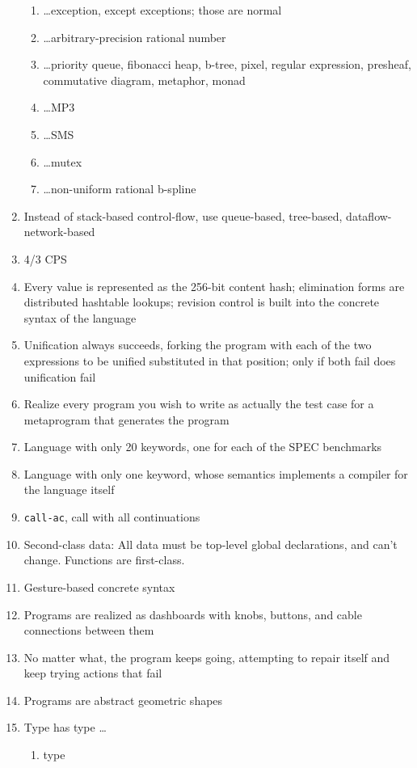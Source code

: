 \documentclass[acmtocl]%
{boviktrans}
\begin{document}
\begin{enumerate}
\begin{enumerate}
     \item \ldots exception, except exceptions; those are normal
     \item \ldots arbitrary-precision rational number
     \item \ldots priority queue, fibonacci heap, b-tree, pixel, regular expression, presheaf, commutative diagram, metaphor, monad
     \item \ldots MP3
     \item \ldots SMS
     \item \ldots mutex
     \item \ldots non-uniform rational b-spline
   \end{enumerate}
\item Instead of stack-based control-flow, use queue-based, tree-based, dataflow-network-based
\item 4/3 CPS
\item Every value is represented as the 256-bit content hash; elimination forms are distributed hashtable lookups; revision control is built into the concrete syntax of the language
\item Unification always succeeds, forking the program with each of the two expressions to be unified substituted in that position; only if both fail does unification fail
\item Realize every program you wish to write as actually the test case for a metaprogram that generates the program
\item Language with only 20 keywords, one for each of the SPEC benchmarks
\item Language with only one keyword, whose semantics implements a compiler for the language itself
\item {\tt call-ac}, call with all continuations
\item Second-class data: All data must be top-level global declarations, and can't change. Functions are first-class.
\item Gesture-based concrete syntax
\item Programs are realized as dashboards with knobs, buttons, and cable connections between them
\item No matter what, the program keeps going, attempting to repair itself and keep trying actions that fail
\item Programs are abstract geometric shapes
\item Type has type \ldots
  \begin{enumerate}
    \item type

\end{enumerate}
\end{enumerate}
\end{document}
